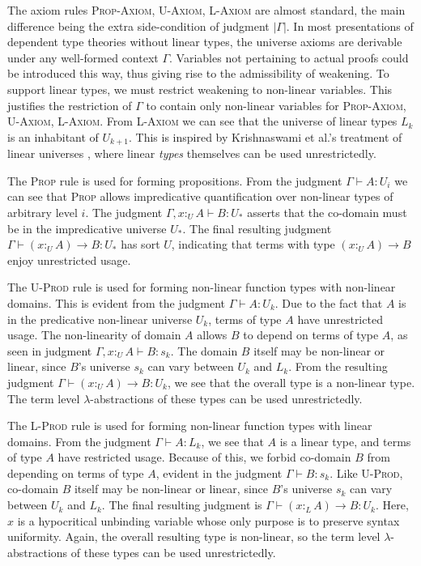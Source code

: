 \documentclass[sigplan,screen]{acmart}
\theoremstyle{definition}
\newcommand{\rname}[1]{\textsc{\footnotesize #1}}
\newcommand{\pure}[1]{|#1|}
\newcommand{\utype}{:_{\scriptscriptstyle U}}
\newcommand{\ltype}{:_{\scriptscriptstyle L}}
\begin{document}
  The axiom rules \rname{Prop-Axiom}, \rname{U-Axiom}, \rname{L-Axiom} are almost standard, the main difference being the extra side-condition of judgment $\pure{\Gamma}$. In most presentations of dependent type theories without linear types, the universe axioms are derivable under any well-formed context $\Gamma$. Variables not pertaining to actual proofs could be introduced this way, thus giving rise to the admissibility of weakening. To support linear types, we must restrict weakening to non-linear variables. This justifies the restriction of $\Gamma$ to contain only non-linear variables for \rname{Prop-Axiom}, \rname{U-Axiom}, \rname{L-Axiom}. From \rname{L-Axiom} we can see that the universe of linear types $L_k$ is an inhabitant of $U_{k+1}$. This is inspired by Krishnaswami et al.'s treatment of linear universes \cite{neel15}, where linear \textit{types} themselves can be used unrestrictedly.

  The \rname{Prop} rule is used for forming propositions. From the judgment $\Gamma \vdash A : U_i$ we can see that \rname{Prop} allows impredicative quantification over non-linear types of arbitrary level $i$. The judgment $\Gamma, x \utype A \vdash B : U_*$ asserts that the co-domain must be in the impredicative universe $U_*$. The final resulting judgment $\Gamma \vdash (x \utype A) \rightarrow B : U_*$ has sort $U$, indicating that terms with type $(x \utype A) \rightarrow B$ enjoy unrestricted usage.

  The \rname{U-Prod} rule is used for forming non-linear function types with non-linear domains. This is evident from the judgment $\Gamma \vdash A : U_k$. Due to the fact that $A$ is in the predicative non-linear universe $U_k$, terms of type $A$ have unrestricted usage. The non-linearity of domain $A$ allows $B$ to depend on terms of type $A$, as seen in judgment $\Gamma, x \utype A \vdash B : s_k$. The domain $B$ itself may be non-linear or linear, since $B$'s universe $s_k$ can vary between $U_k$ and $L_k$. From the resulting judgment $\Gamma \vdash (x \utype A) \rightarrow B : U_k$, we see that the overall type is a non-linear type. The term level $\lambda$-abstractions of these types can be used unrestrictedly.

  The \rname{L-Prod} rule is used for forming non-linear function types with linear domains. From the judgment $\Gamma \vdash A : L_k$, we see that $A$ is a linear type, and terms of type $A$ have restricted usage. Because of this, we forbid co-domain $B$ from depending on terms of type $A$, evident in the judgment $\Gamma \vdash B : s_k$. Like \rname{U-Prod}, co-domain $B$ itself may be non-linear or linear, since $B$'s universe $s_k$ can vary between $U_k$ and $L_k$. The final resulting judgment is $\Gamma \vdash (x \ltype A) \rightarrow B : U_k$. Here, $x$ is a hypocritical unbinding variable whose only purpose is to preserve syntax uniformity. Again, the overall resulting type is non-linear, so the term level $\lambda$-abstractions of these types can be used unrestrictedly.
\end{document}

